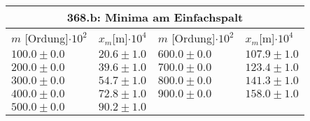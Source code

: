 \documentclass{article}
\begin{document}
\begin{tabular}{|p{3cm}|p{3cm}||p{3cm}|p{3cm}|}
\hline
\multicolumn{4}{|c|}{368.b: Minima am Einfachspalt}\\
\hline
$m$ [Ordung]$\cdot 10^{2}$&$x_m$[m]$\cdot 10^{4}$&$m$ [Ordung]$\cdot 10^{2}$&$x_m$[m]$\cdot 10^{4}$\\
\hline
$100.0\pm0.0$&$20.6\pm 1.0$&$600.0\pm0.0$&$107.9\pm 1.0$\\
$200.0\pm0.0$&$39.6\pm 1.0$&$700.0\pm0.0$&$123.4\pm 1.0$\\
$300.0\pm0.0$&$54.7\pm 1.0$&$800.0\pm0.0$&$141.3\pm 1.0$\\
$400.0\pm0.0$&$72.8\pm 1.0$&$900.0\pm0.0$&$158.0\pm 1.0$\\
$500.0\pm0.0$&$90.2\pm 1.0$&&\\
\hline
\end{tabular}
\end{document}
